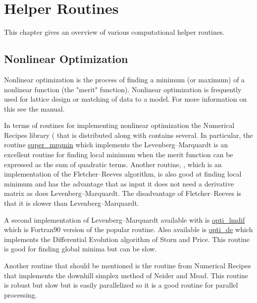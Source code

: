 \chapter{Helper Routines}
\label{c:helper}

This chapter gives an overview of various computational helper routines.

\section{Nonlinear Optimization}
\label{s:opti}

Nonlinear optimization is the process of finding a minimum (or
maximum) of a nonlinear function (the "merit" function). Nonlinear
optimization is frequently used for lattice design or matching of data
to a model. For more information on this see the \tao manual.

In terms of routines for implementing nonlinear optimization the
Numerical Recipes library ( that is distributed along
with \bmad contains several. In particular, 
the routine \hyperref[r:super.mrqmin]{super_mrqmin}
which implements the Levenberg--Marquardt is an excellent routine for
finding local minimum when the merit function can be expressed as the
sum of quadratic terms. Another routine, , which is an
implementation of the Fletcher--Reeves algorithm, is also good at
finding local minimum and has the advantage that as input it does not
need a derivative matrix as does Levenberg--Marquardt. The
disadvantage of Fletcher--Reeves is that it is slower than
Levenberg--Marquardt. 

A second implementation of Levenberg--Marquardt available with \bmad
is \hyperref[r:opti.lmdif]{opti_lmdif} which is Fortran90 version of the popular
 routine. Also available is \hyperref[r:opti.de]{opti_de} which implements
the Differential Evolution algorithm of Storn and
Price\cite{b:storn}. This routine is good for finding global minima
but can be slow. 

Another routine that should be mentioned is the  routine
from Numerical Recipes that implements the downhill simplex method of
Neider and Mead. This routine is robust but slow but is easily
parallelized so it is a good routine for parallel processing.


